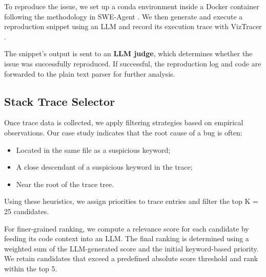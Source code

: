 To reproduce the issue, we set up a conda environment inside a Docker container following the methodology in SWE-Agent \cite{yang2024swe}. We then generate and execute a reproduction snippet using an LLM and record its execution trace with VizTracer \cite{viztracer}.

The snippet’s output is sent to an \textbf{LLM judge}, which determines whether the issue was successfully reproduced. If successful, the reproduction log and code are forwarded to the plain text parser for further analysis.

\subsection{Stack Trace Selector} \label{tracer_2}

Once trace data is collected, we apply filtering strategies based on empirical observations. Our case study indicates that the root cause of a bug is often:

\begin{itemize} 
\item Located in the same file as a suspicious keyword; 
\item A close descendant of a suspicious keyword in the trace; 
\item Near the root of the trace tree. 
\end{itemize}

Using these heuristics, we assign priorities to trace entries and filter the top K = 25 candidates.

For finer-grained ranking, we compute a relevance score for each candidate by feeding its code context into an LLM. The final ranking is determined using a weighted sum of the LLM-generated score and the initial keyword-based priority. We retain candidates that exceed a predefined absolute score threshold and rank within the top 5.